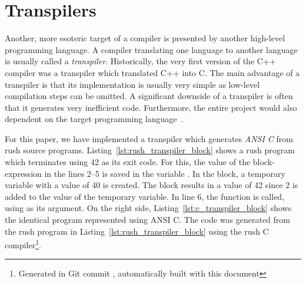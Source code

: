 \section{Transpilers}

Another, more esoteric target of a compiler is presented by another high-level programming language.
A compiler translating one language to another language is usually called a \emph{transpiler}.
Historically, the very first version of the C++ compiler was a transpiler which translated C++ into C.
The main advantage of a transpiler is that its implementation is usually very simple as low-level compilation steps can be omitted.
A significant downside of a transpiler is often that it generates very inefficient code.
Furthermore, the entire project would also dependent on the target programming language~\cite[p.~5]{Jeffery2021}.

For this paper, we have implemented a transpiler which generates \emph{ANSI C} from rush source programs.
Listing~\ref{lst:rush_transpiler_block} shows a rush program which terminates using 42 as its exit code.
For this, the value of the block-expression in the lines 2--5 is saved in the variable .
In the block, a temporary variable with a value of 40 is created.
The block results in a value of 42 since 2 is added to the value of the temporary variable.
In line 6, the  function is called, using  as its argument.
On the right side, Listing~\ref{lst:c_transpiler_block} shows the identical program represented using ANSI C.
The code was generated from the rush program in Listing~\ref{lst:rush_transpiler_block} using the rush C compiler\footnote{Generated in Git commit \rushCommit, automatically built with this document}.

\begin{minipage}{.34\textwidth}
	\center
\end{minipage}%
\hspace{3cm}%
\begin{minipage}{.45\textwidth}
	\center
\end{minipage}

